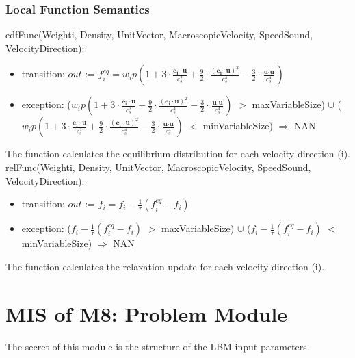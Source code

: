 \documentclass[12pt, titlepage]{article}
\begin{document}
\subsubsection{Local Function Semantics}

\noindent edfFunc(Weighti, Density, UnitVector, MacroscopicVelocity, SpeedSound, VelocityDirection):
\begin{itemize}
	\item transition: $out$ := $f_{i}^{eq} = w_{i}p(1 + 3 \cdot \frac{\textbf{e}_\textbf{i}\cdot\textbf{u}}{c_s^2}+\frac{9}{2} \cdot \frac{(\textbf{e}_\textbf{i}\cdot\textbf{u})^2}{c_s^4}-\frac{3}{2} \cdot \frac{\textbf{u}\cdot\textbf{u}}{c_s^4})$
	\item exception: ($w_{i}p(1 + 3 \cdot \frac{\textbf{e}_\textbf{i}\cdot\textbf{u}}{c_s^2}+\frac{9}{2} \cdot \frac{(\textbf{e}_\textbf{i}\cdot\textbf{u})^2}{c_s^4}-\frac{3}{2} \cdot \frac{\textbf{u}\cdot\textbf{u}}{c_s^4})$ $>$ maxVariableSize) $\cup$ ($w_{i}p(1 + 3 \cdot \frac{\textbf{e}_\textbf{i}\cdot\textbf{u}}{c_s^2}+\frac{9}{2} \cdot \frac{(\textbf{e}_\textbf{i}\cdot\textbf{u})^2}{c_s^4}-\frac{3}{2} \cdot \frac{\textbf{u}\cdot\textbf{u}}{c_s^4})$ $<$ minVariableSize) $\Rightarrow$ NAN
\end{itemize}

The function calculates the equilibrium distribution for each velocity direction (i).\\

\noindent relFunc(Weighti, Density, UnitVector, MacroscopicVelocity, SpeedSound, VelocityDirection):
\begin{itemize}
	\item transition: $out$ := $f_{i} = f_{i} - \frac{1}{\tau}(f_{i}^{eq}-f_{i})$
	\item exception: ($f_{i} - \frac{1}{\tau}(f_{i}^{eq}-f_{i})$ $>$ maxVariableSize) $\cup$ ($f_{i} - \frac{1}{\tau}(f_{i}^{eq}-f_{i})$ $<$ minVariableSize) $\Rightarrow$ NAN
\end{itemize}

The function calculates the relaxation update for each velocity direction (i).\\

\newpage

\section{MIS of M8: Problem Module} \label{PRModule}

The secret of this module is the structure of the LBM input parameters.
\end{document}
